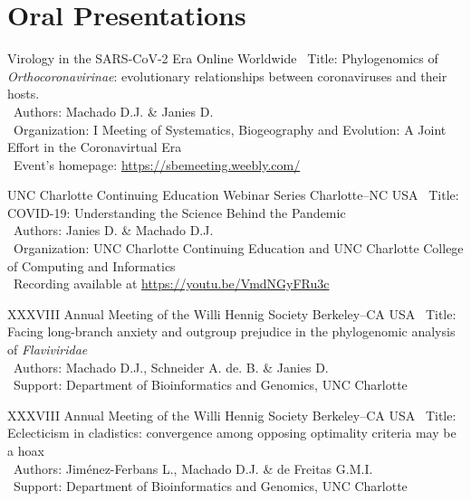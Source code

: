 

\section{Oral Presentations}

	{Virology in the SARS-CoV-2 Era}
	{Online}
	{Worldwide}
	{}
	{
		\textbullet~Title: Phylogenomics of \textit{Orthocoronavirinae}: evolutionary relationships between coronaviruses and their hosts.\\
		\textbullet~Authors: Machado D.J. \& Janies D.\\
		\textbullet~Organization: I Meeting of Systematics, Biogeography and Evolution: A Joint Effort in the Coronavirtual Era\\
		\textbullet~Event's homepage: \url{https://sbemeeting.weebly.com/}
	}

\cventry{---}
	{UNC Charlotte Continuing Education Webinar Series}
	{Charlotte--NC}
	{USA}
	{}
	{
		\textbullet~Title: COVID-19: Understanding the Science Behind the Pandemic\\
		\textbullet~Authors: Janies D. \& Machado D.J.\\
		\textbullet~Organization: UNC Charlotte Continuing Education and UNC Charlotte College of Computing and Informatics\\
		\textbullet~Recording available at \url{https://youtu.be/VmdNGyFRu3c}
	}

	{XXXVIII Annual Meeting of the Willi Hennig Society}
	{Berkeley--CA}
	{USA}
	{}
	{
		\textbullet~Title: Facing long-branch anxiety and outgroup prejudice in the phylogenomic analysis of \emph{Flaviviridae}\\
		\textbullet~Authors: Machado D.J., Schneider A. de. B. \& Janies D.\\
		\textbullet~Support: Department of Bioinformatics and Genomics,  UNC Charlotte
	}

\vspace{.5em}

\cventry{---}
	{XXXVIII Annual Meeting of the Willi Hennig Society}
	{Berkeley--CA}
	{USA}
	{}
	{
		\textbullet~Title: Eclecticism in cladistics: convergence among opposing optimality criteria may be a hoax\\
		\textbullet~Authors: Jiménez-Ferbans L., Machado D.J. \& de Freitas G.M.I.\\ \textbullet~Support: Department of Bioinformatics and Genomics,  UNC Charlotte
	}


